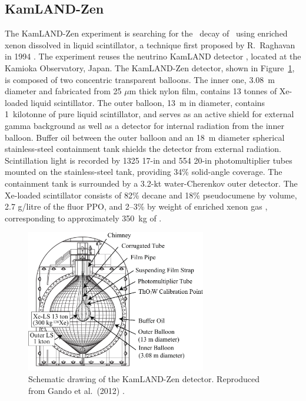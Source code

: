 \documentclass{PoS}
\begin{document}
\subsection{KamLAND-Zen}
The KamLAND-Zen experiment is searching for the \bbonu\ decay of \XE\ using enriched xenon dissolved in liquid scintillator, a technique first proposed by R.~Raghavan in 1994 \cite{Raghavan:1994qw}. The experiment reuses the neutrino KamLAND detector \cite{Abe:2009aa}, located at the Kamioka Observatory, Japan. The KamLAND-Zen detector, shown in Figure~\ref{fig:KamLANDZen}, is composed of two concentric transparent balloons. The inner one, 3.08~m diameter and fabricated from 25 $\mu$m thick nylon film, contains 13 tonnes of Xe-loaded liquid scintillator. The outer balloon, 13~m in diameter, contains 1~kilotonne of pure liquid scintillator, and serves as an active shield for external gamma background as well as a detector for internal radiation from the inner balloon. Buffer oil between the outer balloon and an 18~m diameter spherical stainless-steel containment tank shields the detector from external radiation. Scintillation light is recorded by 1325 17-in and 554 20-in photomultiplier tubes mounted on the stainless-steel tank, providing 34\% solid-angle coverage. The containment tank is surrounded by a 3.2-kt water-Cherenkov outer detector. The Xe-loaded scintillator consists of 82\% decane and 18\% pseudocumene by volume, 2.7 g/litre of the fluor PPO, and 2--3\% by weight of enriched xenon gas \cite{KamLANDZen:2012aa}, corresponding to approximately 350~kg of \XE.

\begin{figure}
\centering
\includegraphics[width=0.7\textwidth]{img/KamLANDZen.pdf}
\caption{Schematic drawing of the KamLAND-Zen detector. Reproduced from Gando et al.\ (2012) \cite{KamLANDZen:2012aa}.} \label{fig:KamLANDZen}
\end{figure}
\end{document}
